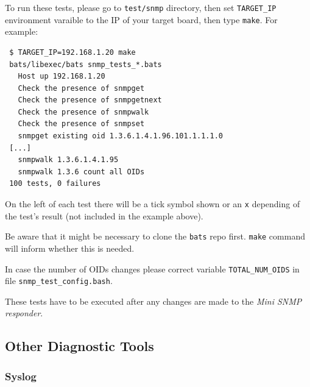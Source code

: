 \documentclass[a4paper, 12pt]{article}
\begin{document}
To run these tests, please go to \texttt{test/snmp} directory, then set
\texttt{TARGET\_IP} environment varaible to the IP of your target board, then type
\texttt{make}. For example:
\begin{lstlisting}
 $ TARGET_IP=192.168.1.20 make
 bats/libexec/bats snmp_tests_*.bats
   Host up 192.168.1.20
   Check the presence of snmpget
   Check the presence of snmpgetnext
   Check the presence of snmpwalk
   Check the presence of snmpset
   snmpget existing oid 1.3.6.1.4.1.96.101.1.1.1.0
 [...]
   snmpwalk 1.3.6.1.4.1.95
   snmpwalk 1.3.6 count all OIDs
 100 tests, 0 failures
\end{lstlisting}
On the left of each test there will be a tick symbol shown or an \texttt{x}
depending of the test's result (not included in the example above).

Be aware that it might be necessary to clone the \texttt{bats} repo first.
\texttt{make} command will inform whether this is needed.

In case the number of OIDs changes please correct variable \texttt{TOTAL\_NUM\_OIDS}
in file \texttt{snmp\_test\_config.bash}.

These tests have to be executed after any changes are made to the \textit{Mini SNMP
responder}.

\subsection{Other Diagnostic Tools}
\label{Other Diagnostic Tools}

\subsubsection{Syslog}
\label{Syslog}
\end{document}

